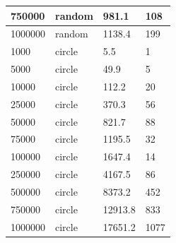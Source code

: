\documentclass[12pt]{article}
\begin{document}
\begin{table}[h!]
\begin{tabular}{|l|l|l|l|}
750000  & random & 981.1                     & 108               \\ \hline
1000000 & random & 1138.4                    & 199               \\ \hline
1000    & circle & 5.5                       & 1                 \\ \hline
5000    & circle & 49.9                      & 5                 \\ \hline
10000   & circle & 112.2                     & 20                \\ \hline
25000   & circle & 370.3                     & 56                \\ \hline
50000   & circle & 821.7                     & 88                \\ \hline
75000   & circle & 1195.5                    & 32                \\ \hline
100000  & circle & 1647.4                    & 14                \\ \hline
250000  & circle & 4167.5                    & 86                \\ \hline
500000  & circle & 8373.2                    & 452               \\ \hline
750000  & circle & 12913.8                   & 833               \\ \hline
1000000 & circle & 17651.2                   & 1077              \\ \hline
\end{tabular}
\label{tab:JarvisScan}
\end{table}
\end{document}
